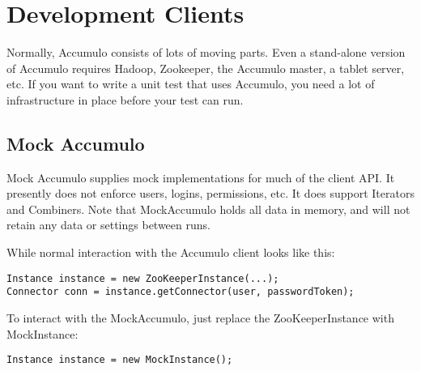 
%
%

\chapter{Development Clients}

Normally, Accumulo consists of lots of moving parts. Even a stand-alone version of
Accumulo requires Hadoop, Zookeeper, the Accumulo master, a tablet server, etc. If
you want to write a unit test that uses Accumulo, you need a lot of infrastructure
in place before your test can run.

\section{Mock Accumulo}

Mock Accumulo supplies mock implementations for much of the client API. It presently
does not enforce users, logins, permissions, etc. It does support Iterators and Combiners.
Note that MockAccumulo holds all data in memory, and will not retain any data or
settings between runs.

While normal interaction with the Accumulo client looks like this:

\begingroup\fontsize{8pt}{8pt}\selectfont\begin{verbatim}
Instance instance = new ZooKeeperInstance(...);
Connector conn = instance.getConnector(user, passwordToken);
\end{verbatim}\endgroup

To interact with the MockAccumulo, just replace the ZooKeeperInstance with MockInstance:

\begingroup\fontsize{8pt}{8pt}\selectfont\begin{verbatim}
Instance instance = new MockInstance();
\end{verbatim}\endgroup

